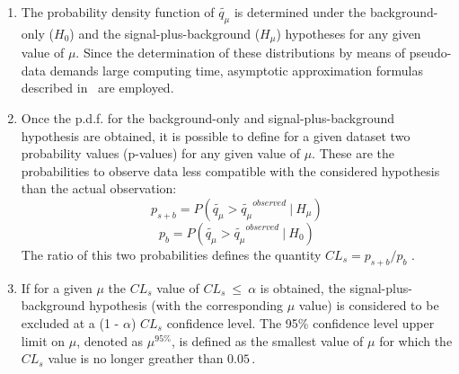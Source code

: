 \begin{enumerate}
%
%
%
	\item The probability density function of $\tilde{q_{\mu}}$ is determined  under the background-only ($H_0$) and 
	the  signal-plus-background ($H_{\mu}$) hypotheses for any given value of $\mu$.
	Since the determination of these distributions by means of pseudo-data demands large computing time,
	asymptotic approximation formulas described in~\cite{Asympt} are employed.
	

	\item Once the p.d.f. for the background-only and signal-plus-background hypothesis are obtained, 
	it is possible to define for a given dataset  two probability values (p-values) for any given value of $\mu$.
	These are the probabilities to observe data less compatible with the considered hypothesis than the 
	actual observation:
	$$
	p_{s+b} = P(\tilde{q_{\mu}} > \tilde{q_{\mu}}^{observed} ~ | ~ H_{\mu})  
	$$
	$$ 
	p_{b} = P(\tilde{q_{\mu}} > \tilde{q_{\mu}}^{observed} ~ | ~ H_0)
	$$
	The ratio of this two probabilities defines the quantity $CL_{s} = p_{s+b} / p_{b}$ \cite{cls1,cls2}.

	\item If for a given $\mu$ the $CL_{s}$ value of $CL_{s} ~ \leq ~ \alpha $ is obtained, the signal-plus-background
	 hypothesis (with the corresponding $\mu$ value)  is considered to be 
	 excluded at a (1 - $\alpha$) $CL_{s}$ confidence level. The 95\% confidence level upper limit on $\mu$,
	denoted as $\mu^{95\%}$, is defined as the smallest value of $\mu$ for which the  $CL_{s}$ value is no longer 
	greather than  $0.05\,.$
\end{enumerate}
